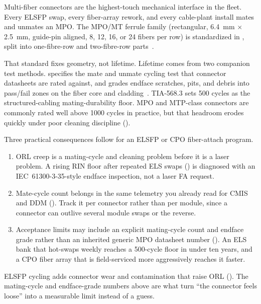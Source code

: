 Multi-fiber connectors are the highest-touch mechanical interface in the fleet.
Every ELSFP swap, every fiber-array rework, and every cable-plant install mates
and unmates an MPO. The MPO/MT ferrule family (rectangular, 6.4~mm $\times$
2.5~mm, guide-pin aligned, 8, 12, 16, or 24 fibers per row) is standardized in
, split into one-fibre-row and two-fibre-row
parts~.

That standard fixes geometry, not lifetime. Lifetime comes from two companion
test methods.  specifies the mate and unmate cycling test
that connector datasheets are rated against, and  grades
endface scratches, pits, and debris into pass/fail zones on the fiber core and
cladding~. TIA-568.3 sets 500 cycles as the
structured-cabling mating-durability floor. MPO and MTP-class connectors are
commonly rated well above 1000 cycles in practice, but that headroom erodes
quickly under poor cleaning discipline ().

Three practical consequences follow for an ELSFP or CPO fiber-attach program.

\begin{enumerate}
\item ORL creep is a mating-cycle and cleaning problem before it is a laser
      problem. A rising RIN floor after repeated ELS swaps
      () is diagnosed with an
      IEC~61300-3-35-style endface inspection, not a laser FA request.
\item Mate-cycle count belongs in the same telemetry you already read for CMIS
      and DDM (). Track it per connector rather than per module,
      since a connector can outlive several module swaps or the reverse.
\item Acceptance limits may include an explicit mating-cycle count and endface
      grade rather than an inherited generic MPO datasheet number
      (). An ELS bank that hot-swaps weekly reaches a
      500-cycle floor in under ten years, and a CPO fiber array that is
      field-serviced more aggressively reaches it faster.
\end{enumerate}

ELSFP cycling adds connector wear and contamination that raise ORL
(). The mating-cycle and endface-grade
numbers above are what turn ``the connector feels loose'' into a measurable
limit instead of a guess.


